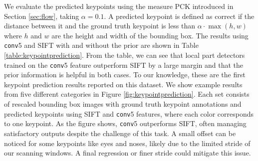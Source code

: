 \documentclass{article} %
\begin{document}

We evaluate the predicted keypoints using the measure PCK introduced
in Section \ref{sec:flow}, taking $\alpha = 0.1$. A predicted keypoint is defined as correct
if the distance between it and the ground truth keypoint is less than $\alpha \cdot \max(h, w)$ where $h$
 and $w$ are the height and width of the bounding box.
The results using \texttt{conv}5 and SIFT
with and without the prior are shown in Table \ref{table:keypointprediction}. From
the table, we can see that local part detectors trained on the \texttt{conv}5 feature
outperform SIFT by a large margin and that the prior information is helpful
in both cases.
To our knowledge, these are the first keypoint prediction results reported on this
dataset.
We
show example results from five different categories in Figure
\ref{fig:keypointprediction}. Each set consists of rescaled bounding box images
with ground truth keypoint annotations and predicted keypoints using SIFT and
\texttt{conv}5 features,  where each color corresponds to one keypoint. As the
figure
shows, \texttt{conv}5 outperforms SIFT,
often managing satisfactory outputs despite the challenge of this
task. A small offset can be noticed for some keypoints like eyes and noses, likely
due to the limited
stride of our scanning windows. A final regression or finer
stride could mitigate this issue.
\end{document}
